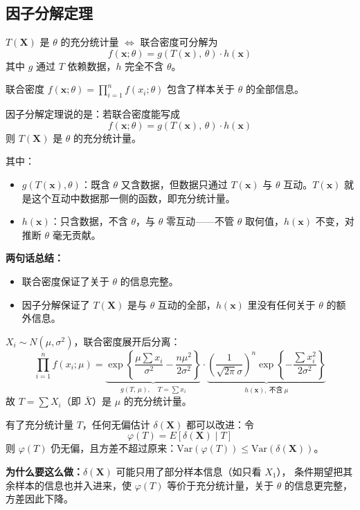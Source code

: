 \subsection{因子分解定理}
\begin{theorem}
$T(\boldsymbol{X})$ 是 $\theta$ 的充分统计量 $\iff$ 联合密度可分解为
$$f(\boldsymbol{x};\theta) = g(T(\boldsymbol{x}),\,\theta)\cdot h(\boldsymbol{x})$$
其中 $g$ 通过 $T$ 依赖数据，$h$ 完全不含 $\theta$。
\end{theorem}
\begin{note}[因子分解定理的直觉]
联合密度 $f(\boldsymbol{x};\theta) = \prod_{i=1}^n f(x_i;\theta)$ 包含了样本关于 $\theta$ 的全部信息。

因子分解定理说的是：若联合密度能写成
$$f(\boldsymbol{x};\theta) = g(T(\boldsymbol{x}),\,\theta)\cdot h(\boldsymbol{x})$$
则 $T(\boldsymbol{X})$ 是 $\theta$ 的充分统计量。

其中：
\begin{itemize}
    \item $g(T(\boldsymbol{x}),\theta)$：既含 $\theta$ 又含数据，但数据只通过 $T(\boldsymbol{x})$ 与 $\theta$ 互动。$T(\boldsymbol{x})$ 就是这个互动中数据那一侧的函数，即充分统计量。
    \item $h(\boldsymbol{x})$：只含数据，不含 $\theta$，与 $\theta$ 零互动——不管 $\theta$ 取何值，$h(\boldsymbol{x})$ 不变，对推断 $\theta$ 毫无贡献。
\end{itemize}
\end{note}
\begin{dxtips}
\textbf{两句话总结：}
\begin{itemize}
    \item 联合密度保证了关于 $\theta$ 的信息完整。
    \item 因子分解保证了 $T(\boldsymbol{X})$ 是与 $\theta$ 互动的全部，$h(\boldsymbol{x})$ 里没有任何关于 $\theta$ 的额外信息。
\end{itemize}
\end{dxtips}
\begin{example}
$X_i \sim N(\mu,\sigma^2)$，联合密度展开后分离：
$$\prod_{i=1}^n f(x_i;\mu)
= \underbrace{\exp\!\left\{\frac{\mu\sum x_i}{\sigma^2} - \frac{n\mu^2}{2\sigma^2}\right\}}_{g(T,\,\mu),\quad T=\sum x_i}
\cdot
\underbrace{\left(\frac{1}{\sqrt{2\pi}\sigma}\right)^{\!n} \exp\!\left\{-\frac{\sum x_i^2}{2\sigma^2}\right\}}_{h(\boldsymbol{x}),\ \text{不含}\ \mu}$$
故 $T = \sum X_i$（即 $\bar{X}$）是 $\mu$ 的充分统计量。
\end{example}
\begin{note}
有了充分统计量 $T$，任何无偏估计 $\delta(\boldsymbol{X})$ 都可以改进：令
$$\varphi(T) = E[\delta(\boldsymbol{X}) \mid T]$$
则 $\varphi(T)$ 仍无偏，且方差不超过原来：$\mathrm{Var}(\varphi(T)) \leq \mathrm{Var}(\delta(\boldsymbol{X}))$。

\textbf{为什么要这么做：}$\delta(\boldsymbol{X})$ 可能只用了部分样本信息（如只看 $X_1$），
条件期望把其余样本的信息也并入进来，使 $\varphi(T)$ 等价于充分统计量，关于 $\theta$ 的信息更完整，方差因此下降。
\end{note}

